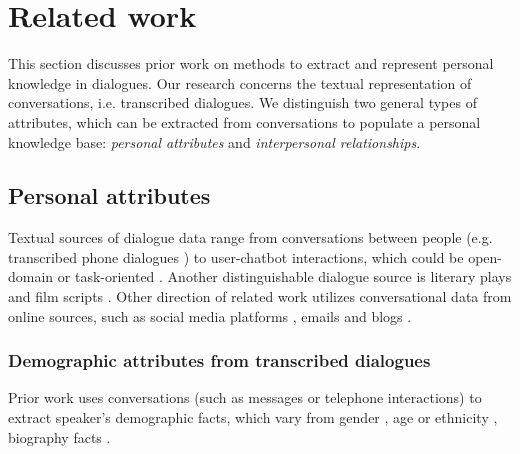 \section{Related work}

This section discusses prior work on methods to extract and represent personal knowledge in dialogues. Our research concerns the textual representation of conversations, i.e. transcribed dialogues. We distinguish two general types of attributes, which can be extracted from conversations to populate a personal knowledge base: \textit{personal attributes} and \textit{interpersonal relationships}.

\subsection{Personal attributes}

Textual sources of dialogue data range from conversations between people (e.g. transcribed phone dialogues \cite{katerenchuk2014your, garera-yarowsky:2009:ACLIJCNLP}) to user-chatbot interactions, which could be open-domain \cite{li2016persona, zhang2018personalizing} or task-oriented \cite{pers2, luo2019learning, qian2019domain}. Another distinguishable dialogue source is literary plays and film scripts \cite{AIIDElin11, nalisnick2013character, jia2020ddrel}. Other direction of related work utilizes conversational data from online sources, such as social media platforms \cite{sap:EMNLP14, pietro:ACL15, pennacchiotti2011machine}, emails \cite{garera-yarowsky:2009:ACLIJCNLP} and blogs \cite{sap:EMNLP14}.

\subsubsection{Demographic attributes from transcribed dialogues}

Prior work uses conversations (such as messages or telephone interactions) to extract speaker's demographic facts, which vary from gender \cite{welch2019look, dial7, garera-yarowsky:2009:ACLIJCNLP}, age \cite{welch2019look, garera-yarowsky:2009:ACLIJCNLP} or ethnicity \cite{garera-yarowsky:2009:ACLIJCNLP, dial7}, biography facts \cite{jing-kambhatla-roukos:2007:ACLMain}.

